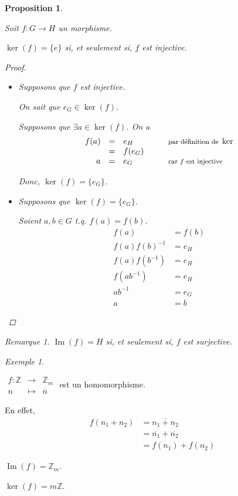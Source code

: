 \documentclass{report}
\newcommand*{\entiers}{\mathbb{Z}}
\newcommand*{\image}{\operatorname{Im}}
\newtheorem*{prop}{Proposition}
\theoremstyle{definition}
\theoremstyle{remark}
\newtheorem*{exem}{Exemple}
\newtheorem*{rema}{Remarque}
\begin{document}
	\begin{prop}~

		Soit $f:G \to H$ un morphisme.

		$\ker(f) = \{e\}$ si, et seulement si, $f$ est injective.
		\begin{proof}~

			\begin{itemize}
				\item[$(\Leftarrow)$] Supposons que $f$ est injective.

				On sait que $e_G \in \ker(f)$.

				Supposons que $\exists a \in \ker(f)$. On a
				\[
				\begin{array}{rclll}
					f(a)&=&e_H&\quad&\text{\footnotesize par d\'efinition de }\ker\\
					&=&f(e_G)\\
					a&=&e_G&&\text{\footnotesize car $f$ est injective}
				\end{array}
				\]

				Donc, $\ker(f) = \{e_G\}$.
				\item[$(\Rightarrow)$] Supposons que $\ker(f) = \{e_G\}$.

				Soient $a,b \in G$ t.q. $f(a) = f(b)$.
				\begin{align*}
					f(a)&= f(b)\\
					f(a)f(b)^{-1}&= e_H\\
					f(a)f(b^{-1})&= e_H\\
					f(ab^{-1})&= e_H\\
					ab^{-1}&= e_G\\
					a&= b
				\end{align*}
			\end{itemize}
		\end{proof}
		\begin{rema}
			$\image(f)=H$ si, et seulement si, $f$ est surjective.
		\end{rema}
	\end{prop}

	
	\begin{exem}~

		$\begin{array}{rcl}
			f:\entiers&\to&\entiers_m\\
			n&\mapsto&\overline{n}
		\end{array}$ est un homomorphisme.

		En effet,
		\begin{align*}
			f(n_1+n_2)&= \overline{n_1+n_2}\\
			&= \overline{n_1} + \overline{n_2}\\
			&= f(n_1) + f(n_2)
		\end{align*}

		$\image(f) = \entiers_m$.

		$\ker(f) = m\entiers$.
	\end{exem}
\end{document}

